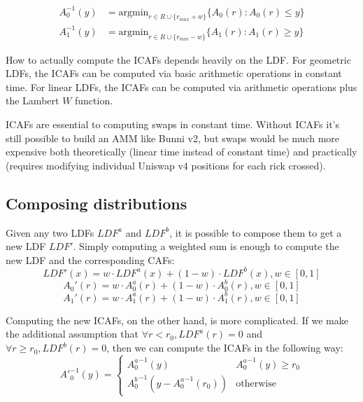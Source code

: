 \documentclass[twocolumn]{article}
\begin{document}
\begin{align}
A_0^{-1}(y) &= \mathrm{argmin}_{r \in R \cup \{r_{max} + w\}} \{A_0(r) : A_0(r) \leq y\} \\
A_1^{-1}(y) &= \mathrm{argmin}_{r \in R \cup \{r_{min} - w\}} \{A_1(r) : A_1(r) \geq y\}
\end{align}

How to actually compute the ICAFs depends heavily on the LDF. For geometric LDFs, the ICAFs can be computed via basic arithmetic operations in constant time. For linear LDFs, the ICAFs can be computed via arithmetic operations plus the Lambert $W$ function.

ICAFs are essential to computing swaps in constant time. Without ICAFs it's still possible to build an AMM like Bunni v2, but swaps would be much more expensive both theoretically (linear time instead of constant time) and practically (requires modifying individual Uniswap v4 positions for each rick crossed). 

\subsection{Composing distributions}

Given any two LDFs $LDF^a$ and $LDF^b$, it is possible to compose them to get a new LDF $LDF'$. Simply computing a weighted sum is enough to compute the new LDF and the corresponding CAFs:  
\begin{equation}
  LDF'(x) = w \cdot LDF^a(x) + (1-w) \cdot LDF^b(x), w \in [0, 1]
\end{equation}
\begin{equation}
  A_0'(r) = w \cdot A_0^a(r) + (1-w) \cdot  A_0^b(r), w \in [0, 1]
\end{equation}
\begin{equation}
  A_1'(r) = w \cdot A_1^a(r) + (1-w) \cdot  A_1^b(r), w \in [0, 1]
\end{equation}

Computing the new ICAFs, on the other hand, is more complicated. If we make the additional assumption that $\forall r < r_0, LDF^a(r)=0$ and $\forall r \ge r_0, LDF^b(r)=0$, then we can compute the ICAFs in the following way:
\begin{equation}
  A'^{-1}_0(y) =
    \begin{cases}
      {A_0^a}^{-1}(y) & {A_0^a}^{-1}(y) \ge r_0\\
      {A_0^b}^{-1}(y - {A_0^a}^{-1}(r_0)) & \text{otherwise} 
    \end{cases}       
\end{equation}
\end{document}
